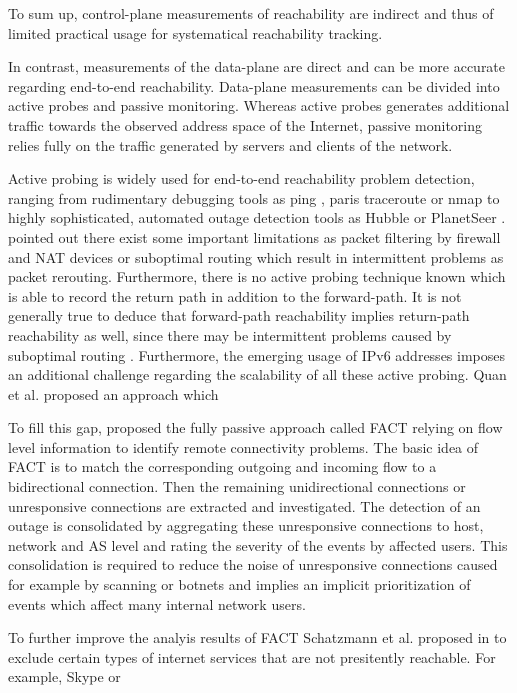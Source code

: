 \documentclass{sigcomm-alternate}
\begin{document}
To sum up, control-plane measurements of reachability are indirect
and thus of limited practical usage for systematical reachability
tracking.

In contrast, measurements of the data-plane are direct and can be
more accurate regarding end-to-end reachability. Data-plane
measurements can be divided into active probes and passive monitoring.
Whereas active probes generates additional traffic towards the
observed address space of the Internet, passive monitoring relies
fully on the traffic generated by servers and clients of the network.

Active probing is widely used for end-to-end reachability problem
detection, ranging from rudimentary debugging tools as ping
\cite{PING}, paris traceroute \cite{traceroute} or nmap \cite{Nmap}
to highly sophisticated, automated outage detection tools as Hubble
\cite{Katz:2008} or PlanetSeer \cite{Zhang:2004}. \cite{Bush:Optometry}
pointed out there exist some important limitations as packet filtering
by firewall and NAT devices or suboptimal routing which result in
intermittent problems as packet rerouting. Furthermore, there is
no active probing technique known which is able to record the return
path in addition to the forward-path. It is not generally true to
deduce that forward-path reachability implies return-path reachability
as well, since there may be intermittent problems caused by suboptimal
routing \cite{Bush:Optometry}. Furthermore, the emerging usage of IPv6
addresses imposes an additional challenge regarding the scalability of
all these active probing. Quan et al.\cite{Quan12a} proposed an approach
which

To fill this gap, \cite{SchatzmannPAM2011} proposed the fully
passive approach called FACT relying on flow level information to
identify remote connectivity problems. The basic idea of FACT is to
match the corresponding outgoing and incoming flow to a bidirectional
connection. Then the remaining unidirectional connections or unresponsive
connections are extracted and investigated. The detection of an outage
is consolidated by aggregating these unresponsive connections to host,
network and AS level and rating the severity of the events by affected
users. This consolidation is required to reduce the noise of unresponsive
connections caused for example by scanning or botnets and implies an
implicit prioritization of events which affect many internal network
users.

To further improve the analyis results of FACT Schatzmann et al. 
proposed in \cite{MyPhDThesis} to exclude certain types of 
internet services that are not presitently reachable. For example, 
Skype or 
\end{document}
